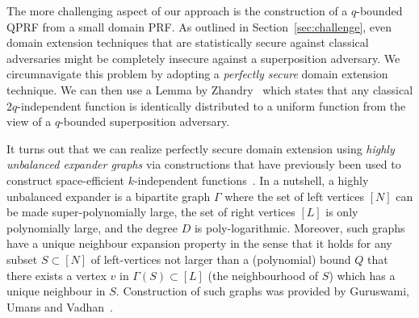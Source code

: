  The more challenging aspect of our approach is the construction of a $q$-bounded QPRF from a small domain PRF. As outlined in Section~\ref{sec:challenge}, even domain extension techniques that are statistically secure against classical adversaries might be completely insecure against a superposition adversary. We circumnavigate this problem by adopting a \emph{perfectly secure} domain extension technique. We can then use a Lemma by Zhandry~\cite{FOCS:Zhandry12} which states that any classical $2q$-independent function is identically distributed to a uniform function from the view of a $q$-bounded superposition adversary.
 
It turns out that we can realize perfectly secure domain extension using \emph{highly unbalanced expander graphs} via constructions that have previously been used to construct space-efficient $k$-independent functions~\cite{STOC:ChrPagTho15}.
In a nutshell, a highly unbalanced expander is a bipartite graph $\Gamma$ where the set of left vertices $[N]$ can be made super-polynomially large, the set of right vertices $[L]$ is only polynomially large, and the degree $D$ is poly-logarithmic. Moreover, such graphs have a unique neighbour expansion property in the sense that it holds for any subset $S \subset [N]$ of left-vertices not larger than a (polynomial) bound $Q$ that there exists a vertex $v$ in $\Gamma(S) \subset [L]$ (the neighbourhood of $S$) which has a unique neighbour in $S$. Construction of such graphs was provided by Guruswami, Umans and Vadhan~\cite{GurUmaVad09}.

